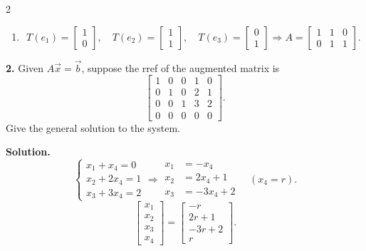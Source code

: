 \documentclass[8pt]{extarticle}
\begin{document}
\begin{multicols}{2}
\begin{tcolorbox}[title=]
\begin{enumerate}
\[=r\,T\!\left(\begin{bmatrix}x_{1}\\x_{2}\\x_{3}\end{bmatrix}\right).
\]
So \(T\) is linear.
\item
\[
T(e_{1})=\begin{bmatrix}1\\0\end{bmatrix},\quad
T(e_{2})=\begin{bmatrix}1\\1\end{bmatrix},\quad
T(e_{3})=\begin{bmatrix}0\\1\end{bmatrix}
\Rightarrow
A=\begin{bmatrix}1&1&0\\0&1&1\end{bmatrix}.
\]
\end{enumerate}
\end{tcolorbox}

\begin{tcolorbox}[title=]
\noindent
\textbf{2.} Given \(A\vec{x}=\vec{b}\), suppose the rref of the augmented matrix is
\[
\left[
\begin{array}{cccc|c}
1&0&0&1&0\\
0&1&0&2&1\\
0&0&1&3&2\\
0&0&0&0&0
\end{array}
\right].
\]
Give the general solution to the system.

\textbf{Solution.}
\[
\begin{cases}
x_{1}+x_{4}=0\\
x_{2}+2x_{4}=1\\
x_{3}+3x_{4}=2
\end{cases}
\Rightarrow
\begin{aligned}
x_{1}&=-x_{4}\\
x_{2}&=2x_{4}+1\\
x_{3}&=-3x_{4}+2
\end{aligned}
\quad(x_{4}=r).
\]
\[
\begin{bmatrix}x_{1}\\x_{2}\\x_{3}\\x_{4}\end{bmatrix}
=\begin{bmatrix}-r\\2r+1\\-3r+2\\r\end{bmatrix}.
\]
\end{tcolorbox}


\end{multicols}
\end{document}
